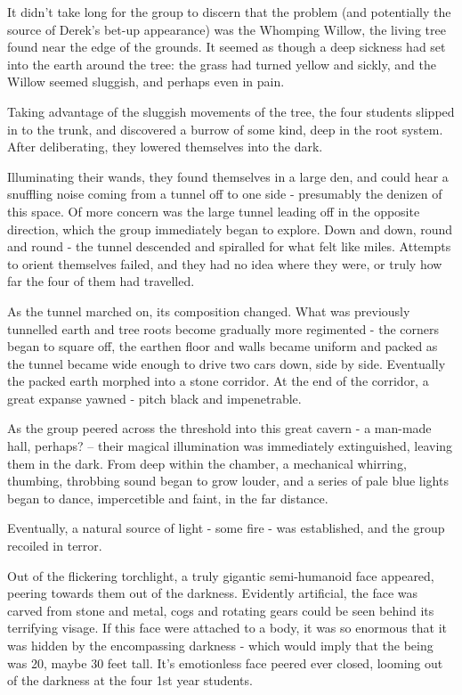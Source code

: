 \documentclass[oneside]{book}
\begin{document}
It didn't take long for the group to discern that the problem (and potentially the source of Derek's bet-up appearance) was the Whomping Willow, the living tree found near the edge of the grounds. It seemed as though a deep sickness had set into the earth around the tree: the grass had turned yellow and sickly, and the Willow seemed sluggish, and perhaps even in pain. 

Taking advantage of the sluggish movements of the tree, the four students slipped in to the trunk, and discovered a burrow of some kind, deep in the root system. After deliberating, they lowered themselves into the dark. 

Illuminating their wands, they found themselves in a large den, and could hear a snuffling noise coming from a tunnel off to one side - presumably the denizen of this space. Of more concern was the large tunnel leading off in the opposite direction, which the group immediately began to explore. Down and down, round and round - the tunnel descended and spiralled for what felt like miles. Attempts to orient themselves failed, and they had no idea where they were, or truly how far the four of them had travelled. 

As the tunnel marched on, its composition changed. What was previously tunnelled earth and tree roots become gradually more regimented - the corners began to square off, the earthen floor and walls became uniform and packed as the tunnel became wide enough to drive two cars down, side by side. Eventually the packed earth morphed into a stone corridor. At the end of the corridor, a great expanse yawned - pitch black and impenetrable. 

As the group peered across the threshold into this great cavern - a man-made hall, perhaps? -- their magical illumination was immediately extinguished, leaving them in the dark. From deep within the chamber, a mechanical whirring, thumbing, throbbing sound began to grow louder, and a series of pale blue lights began to dance, impercetible and faint, in the far distance. 

Eventually, a natural source of light - some fire - was established, and the group recoiled in terror. 

Out of the flickering torchlight, a truly gigantic semi-humanoid face appeared, peering towards them out of the darkness. Evidently artificial, the face was carved from stone and metal, cogs and rotating gears could be seen behind its terrifying visage. If this face were attached to a body, it was so enormous that it was hidden by the encompassing darkness - which would imply that the being was 20, maybe 30 feet tall. It's emotionless face peered ever closed, looming out of the darkness at the four 1st year students. 
\end{document}
